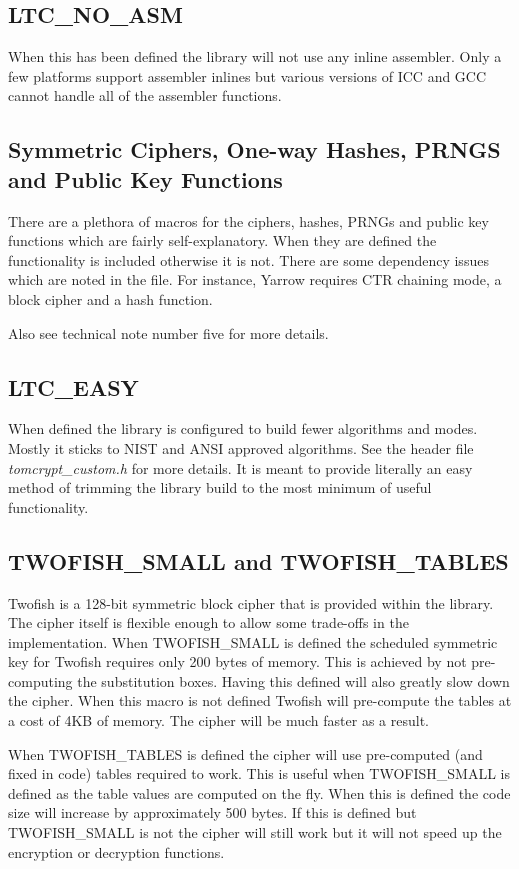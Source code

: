\documentclass[synpaper]{book}
\begin{document}
\subsection{LTC\_NO\_ASM}
When this has been defined the library will not use any inline assembler.  Only a few platforms support assembler inlines but various versions of ICC and GCC
cannot handle all of the assembler functions.  

\subsection{Symmetric Ciphers, One-way Hashes, PRNGS and Public Key Functions}
There are a plethora of macros for the ciphers, hashes, PRNGs and public key functions which are fairly 
self-explanatory.  When they are defined the functionality is included otherwise it is not.  There are some 
dependency issues which are noted in the file.  For instance, Yarrow requires CTR chaining mode, a block 
cipher and a hash function.

Also see technical note number five for more details.

\subsection{LTC\_EASY}
When defined the library is configured to build fewer algorithms and modes.  Mostly it sticks to NIST and ANSI approved algorithms.  See 
the header file \textit{tomcrypt\_custom.h} for more details.  It is meant to provide literally an easy method of trimming the library 
build to the most minimum of useful functionality.

\subsection{TWOFISH\_SMALL and TWOFISH\_TABLES}
Twofish is a 128-bit symmetric block cipher that is provided within the library.  The cipher itself is flexible enough
to allow some trade-offs in the implementation.  When TWOFISH\_SMALL is defined the scheduled symmetric key for Twofish 
requires only 200 bytes of memory.  This is achieved by not pre-computing the substitution boxes.  Having this 
defined will also greatly slow down the cipher.  When this macro is not defined Twofish will pre-compute the 
tables at a cost of 4KB of memory.  The cipher will be much faster as a result.  

When TWOFISH\_TABLES is defined the cipher will use pre-computed (and fixed in code) tables required to work.  This is
useful when TWOFISH\_SMALL is defined as the table values are computed on the fly.  When this is defined the code size
will increase by approximately 500 bytes.  If this is defined but TWOFISH\_SMALL is not the cipher will still work but
it will not speed up the encryption or decryption functions.
\end{document}
